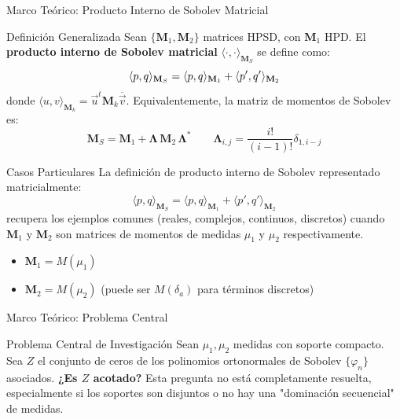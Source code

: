 \begin{frame}{Marco Teórico: Producto Interno de Sobolev Matricial}
	\footnotesize
	\begin{block}{\footnotesize Definición Generalizada \cite{escribano2025boundedness}}
		Sean $\{\mathbf{M}_1, \mathbf{M}_2\}$ matrices HPSD, con $\mathbf{M}_1$ HPD.
		El \textbf{producto interno de Sobolev matricial} $\langle \cdot, \cdot \rangle_{\mathbf{M}_{S}}$ se define como:
		$${\footnotesize \langle p, q \rangle_{\mathbf{M}_{S}} = \langle p, q \rangle_{\mathbf{M}_1} + \langle p', q' \rangle_{\mathbf{M}_2}}$$
		donde $\langle u, v \rangle_{\mathbf{M}_k} = \vec{u}^t \mathbf{M}_k \overline{\vec{v}}$.
		Equivalentemente, la matriz de momentos de Sobolev es:
		$$ \mathbf{M}_S = \mathbf{M}_1 + \boldsymbol{\Lambda}\,\mathbf{M}_2\, \boldsymbol{\Lambda}^* \qquad \boldsymbol{\Lambda}_{i,j}=\frac{i!}{(i-1)!}\delta_{1,i-j}$$
	\end{block}
	\begin{block}{\footnotesize Casos Particulares}
		La definición de producto interno de Sobolev representado matricialmente:
		$$ \langle p, q \rangle_{\mathbf{M}_{S}} = \langle p, q \rangle_{\mathbf{M}_1} + \langle p', q' \rangle_{\mathbf{M}_2} $$
		recupera los ejemplos comunes (reales, complejos, continuos, discretos) cuando $\mathbf{M}_1$ y $\mathbf{M}_2$ son matrices de momentos de medidas $\mu_1$ y $\mu_2$ respectivamente.
		\begin{itemize}
			\item $\mathbf{M}_1 = M(\mu_1)$
			\item $\mathbf{M}_2 = M(\mu_2)$ (puede ser $M(\delta_a)$ para términos discretos)
		\end{itemize}
	\end{block}
\end{frame}

\begin{frame}{Marco Teórico: Problema Central}
	\begin{exampleblock}{Problema Central de Investigación} %
		Sean $\mu_1, \mu_2$ medidas con soporte compacto. Sea $Z$ el conjunto de ceros de los polinomios ortonormales de Sobolev $\{\varphi_n\}$ asociados.
		\vspace{0.1cm}
		\centering \textbf{¿Es $Z$ acotado?}
		\vspace{0.1cm}
		Esta pregunta no está completamente resuelta, especialmente si los soportes son disjuntos o no hay una "dominación secuencial" de medidas.
	\end{exampleblock}
\end{frame}

